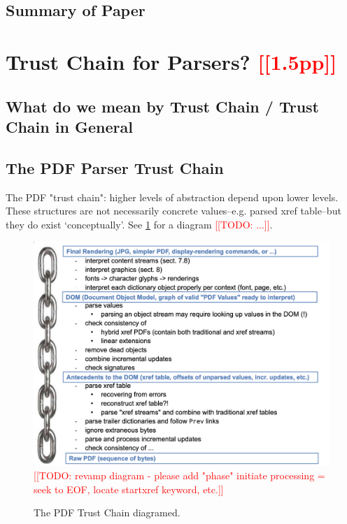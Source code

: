 \documentclass[conference,12pt]{IEEEtran}
\newcommand{\note}[1]{\noteYes{#1}}
\newcommand{\noteYes}[1]{\textcolor{red}{[[#1]]}}
\newcommand{\todo}[1]{\note{TODO: #1}}
\begin{document}
\subsection{Summary of Paper}
      
\section{Trust Chain for Parsers? \note{1.5pp}}
\label{sec:trustchain}

\subsection{What do we mean by Trust Chain / Trust Chain in General}

\subsection{The PDF Parser Trust Chain}

The PDF "trust chain": higher levels of abstraction depend upon lower levels.
These structures are not necessarily concrete values--e.g. parsed xref table--but they do exist `conceptually'.
See \cref{fig:pdf-trust-chain} for a diagram \todo{...}.

\begin{figure}[t]
    \centering
    \includegraphics[width=\linewidth]{figures/trustchain-diagram.png}
    \todo{revamp diagram - please add "phase" initiate processing = seek to EOF, locate startxref keyword, etc.}
    \caption{The PDF Trust Chain diagramed.}
    \label{fig:pdf-trust-chain}
\end{figure}
\end{document}
